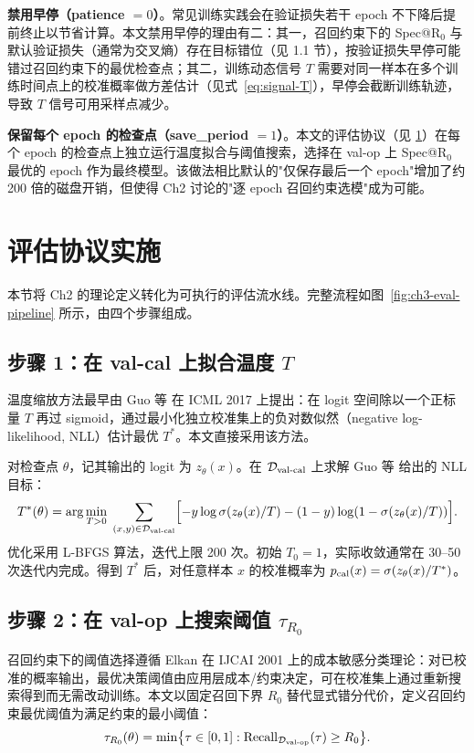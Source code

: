 \documentclass[UTF8,openany,12pt]{ctexbook}
\begin{document}
\textbf{禁用早停（patience $= 0$）}。常见训练实践会在验证损失若干 epoch 不下降后提前终止以节省计算。本文禁用早停的理由有二：其一，召回约束下的 Spec@R$_0$ 与默认验证损失（通常为交叉熵）存在目标错位（见 1.1 节），按验证损失早停可能错过召回约束下的最优检查点；其二，训练动态信号 $T$ 需要对同一样本在多个训练时间点上的校准概率做方差估计（见式~\eqref{eq:signal-T}），早停会截断训练轨迹，导致 $T$ 信号可用采样点减少。

\textbf{保留每个 epoch 的检查点（save\_period $= 1$）}。本文的评估协议（见 \ref{sec:eval-impl}）在每个 epoch 的检查点上独立运行温度拟合与阈值搜索，选择在 val-op 上 Spec@R$_0$ 最优的 epoch 作为最终模型。该做法相比默认的"仅保存最后一个 epoch"增加了约 200 倍的磁盘开销，但使得 Ch2 讨论的"逐 epoch 召回约束选模"成为可能。

\section{评估协议实施}
\label{sec:eval-impl}

本节将 Ch2 的理论定义转化为可执行的评估流水线。完整流程如图~\ref{fig:ch3-eval-pipeline} 所示，由四个步骤组成。

\subsection{步骤 1：在 val-cal 上拟合温度 $T$}
温度缩放方法最早由 Guo 等\cite{guo2017calibration} 在 ICML 2017 上提出：在 logit 空间除以一个正标量 $T$ 再过 sigmoid，通过最小化独立校准集上的负对数似然（negative log-likelihood, NLL）估计最优 $T^{\ast}$。本文直接采用该方法。

对检查点 $\theta$，记其输出的 logit 为 $z_{\theta}(x)$。在 $\mathcal{D}_{\rm val\text{-}cal}$ 上求解 Guo 等\cite{guo2017calibration} 给出的 NLL 目标：
\begin{equation}
T^{\ast}(\theta) = \arg\min_{T > 0}\; \sum_{(x, y) \in \mathcal{D}_{\rm val\text{-}cal}} \Bigl[-y\log\sigma(z_{\theta}(x)/T) - (1-y)\log(1 - \sigma(z_{\theta}(x)/T))\Bigr].
\label{eq:T-fit-implementation}
\end{equation}
优化采用 L-BFGS 算法，迭代上限 200 次。初始 $T_0 = 1$，实际收敛通常在 30--50 次迭代内完成。得到 $T^{\ast}$ 后，对任意样本 $x$ 的校准概率为 $p_{\rm cal}(x) = \sigma(z_{\theta}(x) / T^{\ast})$。

\subsection{步骤 2：在 val-op 上搜索阈值 $\tau_{R_0}$}
召回约束下的阈值选择遵循 Elkan\cite{elkan2001foundations} 在 IJCAI 2001 上的成本敏感分类理论：对已校准的概率输出，最优决策阈值由应用层成本/约束决定，可在校准集上通过重新搜索得到而无需改动训练。本文以固定召回下界 $R_0$ 替代显式错分代价，定义召回约束最优阈值为满足约束的最小阈值：
\begin{equation}
\tau_{R_0}(\theta) = \min\bigl\{\tau \in [0, 1] : \mathrm{Recall}_{\mathcal{D}_{\rm val\text{-}op}}(\tau) \geq R_0\bigr\}.
\label{eq:tau-search}
\end{equation}
\end{document}
